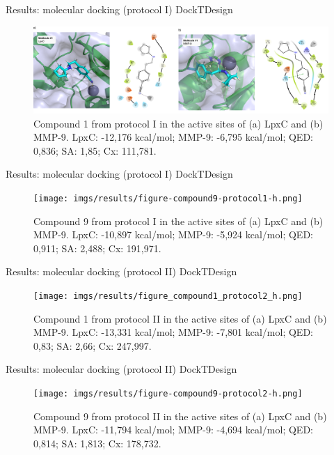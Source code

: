 \documentclass[aspectratio=169,xcolor=dvipsnames]{beamer}
\begin{document}
\begin{frame}{Results: molecular docking (protocol I) \hfill {\footnotesize \alert{DockTDesign}}}
    \begin{figure}
        \centering
        \includegraphics[width=1\textwidth]{imgs/results/figure-compound1-protocol1-h.png}
        \caption{Compound 1 from protocol I in the active sites of (a) LpxC and (b) MMP-9. LpxC: -12{,}176 kcal/mol; MMP-9: -6{,}795 kcal/mol; QED: 0{,}836; SA: 1{,}85; Cx: 111{,}781.}
    \end{figure}
\end{frame}


\begin{frame}{Results: molecular docking (protocol I) \hfill {\footnotesize \alert{DockTDesign}}}
    \begin{figure}
        \centering
        \texttt{[image: imgs/results/figure-compound9-protocol1-h.png]}
        \caption{Compound 9 from protocol I in the active sites of (a) LpxC and (b) MMP-9. LpxC: -10{,}897 kcal/mol; MMP-9: -5{,}924 kcal/mol; QED: 0{,}911; SA: 2{,}488; Cx: 191{,}971.}
    \end{figure}
\end{frame}


\begin{frame}{Results: molecular docking (protocol II) \hfill {\footnotesize \alert{DockTDesign}}}
    \begin{figure}
        \centering
        \texttt{[image: imgs/results/figure\_compound1\_protocol2\_h.png]}
        \caption{Compound 1 from protocol II in the active sites of (a) LpxC and (b) MMP-9. LpxC: -13{,}331 kcal/mol; MMP-9: -7{,}801 kcal/mol; QED: 0{,}83; SA: 2{,}66; Cx: 247{,}997.}
    \end{figure}
\end{frame}


\begin{frame}{Results: molecular docking (protocol II) \hfill {\footnotesize \alert{DockTDesign}}}
    \begin{figure}
        \centering
        \texttt{[image: imgs/results/figure-compound9-protocol2-h.png]}
        \caption{Compound 9 from protocol II in the active sites of (a) LpxC and (b) MMP-9. LpxC: -11{,}794 kcal/mol; MMP-9: -4{,}694 kcal/mol; QED: 0{,}814; SA: 1{,}813; Cx: 178{,}732.}
    \end{figure}
\end{frame}
\end{document}
